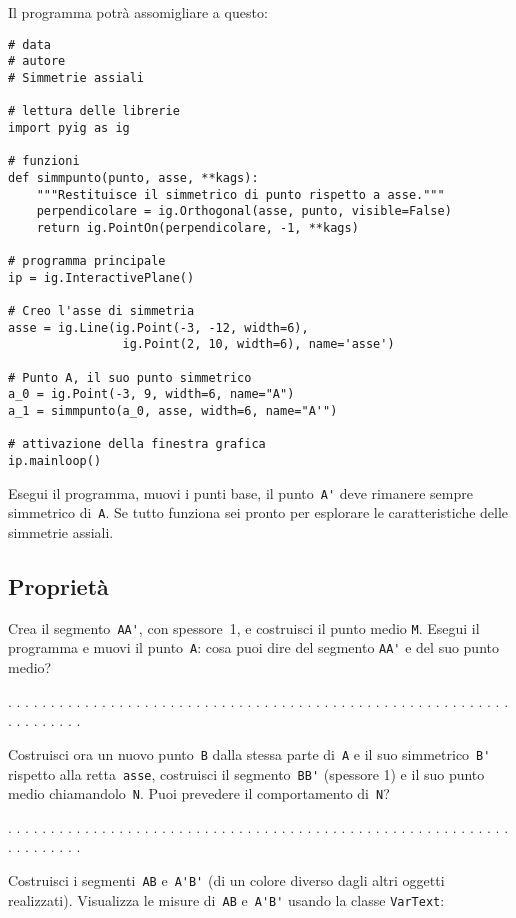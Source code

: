 Il programma potrà assomigliare a questo:

\begin{lstlisting}
# data
# autore
# Simmetrie assiali

# lettura delle librerie
import pyig as ig

# funzioni
def simmpunto(punto, asse, **kags):
    """Restituisce il simmetrico di punto rispetto a asse."""
    perpendicolare = ig.Orthogonal(asse, punto, visible=False)
    return ig.PointOn(perpendicolare, -1, **kags)

# programma principale
ip = ig.InteractivePlane()

# Creo l'asse di simmetria
asse = ig.Line(ig.Point(-3, -12, width=6),
                ig.Point(2, 10, width=6), name='asse')

# Punto A, il suo punto simmetrico
a_0 = ig.Point(-3, 9, width=6, name="A")
a_1 = simmpunto(a_0, asse, width=6, name="A'")

# attivazione della finestra grafica
ip.mainloop()
\end{lstlisting}

Esegui il programma, muovi i punti base, il punto~\lstinline{A'} deve rimanere
sempre simmetrico di~\lstinline{A}. Se tutto funziona sei pronto per
esplorare le caratteristiche delle simmetrie assiali.


\subsection{Proprietà}

Crea il segmento~\lstinline{AA'}, con spessore~1, e costruisci il punto medio 
\lstinline{M}.
Esegui il programma e muovi il punto~\lstinline{A}: cosa puoi dire del segmento 
\lstinline{AA'}
e del suo punto medio?

. . . . . . . . . . . . . . . . . . . . . . . . . . . . . . . . . . . . . . . .
. . . . . . . . . . . . . . . . . . . . . . . . . . . .

Costruisci ora un nuovo punto~\lstinline{B} dalla stessa parte di~\lstinline{A}
e il suo simmetrico~\lstinline{B'} rispetto alla retta~\lstinline{asse},
costruisci il segmento~\lstinline{BB'} (spessore 1) e il suo punto medio
chiamandolo~\lstinline{N}.
Puoi prevedere il comportamento di~\lstinline{N}?

. . . . . . . . . . . . . . . . . . . . . . . . . . . . . . . . . . . . . . . .
. . . . . . . . . . . . . . . . . . . . . . . . . . . .

Costruisci i segmenti~\lstinline{AB} e~\lstinline{A'B'}
(di un colore diverso dagli altri oggetti realizzati).
Visualizza le misure di~\lstinline{AB} e~\lstinline{A'B'} usando la classe 
\lstinline{VarText}:

